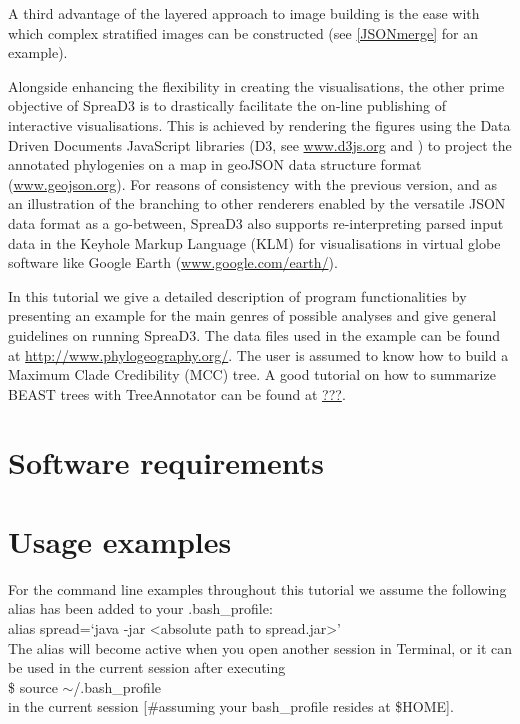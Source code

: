 \documentclass[english]{paper}
\begin{document}
A third advantage of the layered approach to image building is the ease with which complex stratified images can be constructed (see \ref{JSONmerge} for an example). 
\par
Alongside enhancing the flexibility in creating the visualisations, the other prime objective of SpreaD3 is to drastically facilitate the on-line publishing of interactive visualisations.
This is achieved by rendering the figures using the Data Driven Documents JavaScript libraries (D3, see \url{www.d3js.org} and \citet{Bostock:2011aa}) to project the annotated phylogenies on a map in geoJSON data structure format (\url{www.geojson.org}).
For reasons of consistency with the previous version, and as an illustration of the branching to other renderers enabled by the versatile JSON data format as a go-between, SpreaD3 also supports re-interpreting parsed input data in the Keyhole Markup Language (KLM) for visualisations in virtual globe software like Google Earth (\url{www.google.com/earth/}). 


\par
In this tutorial we give a detailed description of program functionalities by presenting an example for the main genres of possible analyses and give general guidelines on running SpreaD3. 
The data files used in the example can be found at \url{http://www.phylogeography.org/}.
The user is assumed to know how to build a Maximum Clade Credibility (MCC) tree. 
A good tutorial on how to summarize BEAST trees with TreeAnnotator can be found at \url{???}.

\section{Software requirements}

\section{Usage examples}
% 
% 
For the command line examples throughout this tutorial we assume the following alias has been added to your .bash\_profile:
\\
alias spread=`java -jar <absolute path to spread.jar>' 
\\
The alias will become active when you open another session in Terminal, or it can be used in the current session after executing
\\
\$ source $\sim$/.bash\_profile
\\
in the current session  [\#assuming your bash\_profile resides at \$HOME]. 
\end{document}
